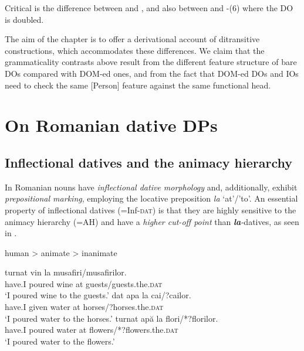 \documentclass[output=paper,colorlinks,citecolor=brown,nonflat]{langsci/langscibook}
\begin{document}
Critical is the difference between  and , and also between  and -(6) where the DO is doubled.

The aim of the chapter is to offer a derivational account of ditransitive constructions, which accommodates these differences. We claim that the grammaticality contrasts above result from the different feature structure of bare DOs compared with DOM-ed ones, and from the fact that DOM-ed DOs and IOs need to check the same [Person] feature against the same functional head.

\section{On Romanian dative DPs} %

\subsection{Inflectional datives and the animacy hierarchy} %

In Romanian nouns have \textit{inflectional dative morphology} and, additionally, exhibit \textit{prepositional marking}, employing the locative preposition \textit{la} ‘at’/’to’. An essential property of inflectional datives (=Inf-\textsc{dat}) is that they are highly sensitive to the animacy hierarchy (=AH) and have a \textit{higher cut-off point} than \textbf{\textit{la}}\textit{{}-}datives, as seen in .

\ea%
    \label{ex:cornilescu:7}
    human > animate > inanimate
    \z



\ea%
    \label{ex:cornilescu:8}
    \ea \label{ex:cornilescu:8a}
       {turnat}  {vin}   {la} musafiri/musafirilor.	\\
       	 have.I   poured   wine   at guests/guests.the.\textsc{dat}	 \\
    \glt ‘I poured wine to the guests.’
    \ex \label{ex:cornilescu:8b}
    	 {dat}    {apa}  {la} cai/{?}cailor. 	\\
    	have.I given   water   at horses/{?}horses.the.\textsc{dat} \\
    	\glt ‘I poured water to the horses.’
    \ex  \label{ex:cornilescu:8c}
     {turnat}  {apă}  {la} flori/*?florilor.	\\
     		have.I poured   water   at flowers/*?flowers.the.\textsc{dat} \\
    \glt	‘I poured water to the flowers.’
   	\z
    \z
\end{document}
